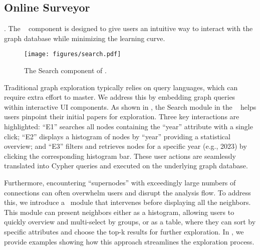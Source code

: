 \subsection{Online Surveyor}
\label{sec:surveyor}



.  The \explorer~ component is designed to give users an intuitive way to interact with the graph database while minimizing the learning curve. %

\begin{figure}
    \centering
    \texttt{[image: figures/search.pdf]}
    \caption{The Search component of \sys.}
    \label{fig:search_component}
    \vspace*{-2em}
\end{figure}

Traditional graph exploration typically relies on query languages, which can require extra effort to master. We address this by embedding graph queries within interactive UI components. As shown in , the Search module in the \explorer~ helps users pinpoint their initial papers for exploration. Three key interactions are highlighted: ``E1'' searches all nodes containing the ``year'' attribute with a single click; ``E2'' displays a histogram of nodes by ``year'' providing a statistical overview; and ``E3'' filters and retrieves nodes for a specific year (e.g., 2023) by clicking the corresponding histogram bar. These user actions are seamlessly translated into Cypher queries and executed on the underlying graph database.

Furthermore, encountering “supernodes” with exceedingly large numbers of connections can often overwhelm users and disrupt the analysis flow. To address this, we introduce a \statfilter~module that intervenes before displaying all the neighbors. This module can present neighbors either as a histogram, allowing users to quickly overview and multi-select by groups, or as a table, where they can sort by specific attributes and choose the top-k results for further exploration. In , we provide examples showing how this approach streamlines the exploration process.


